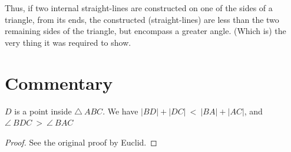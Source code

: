 Thus, if two internal straight-lines are constructed on one of the sides
of a triangle, from its ends, 
the constructed (straight-lines) are less than the two remaining 
sides of the triangle, but  encompass a greater angle. (Which is) the
very thing it was required to show.


\section*{Commentary}

\begin{proposition}\label{proposition_21}\leanok
    $D$ is a point inside $\triangle~ABC$. We have $|BD| + |DC|~<~|BA| + |AC|$, and $\angle~BDC~>~\angle~BAC$
\end{proposition}
\begin{proof}
    \leanok
    See the original proof by Euclid.
\end{proof}
